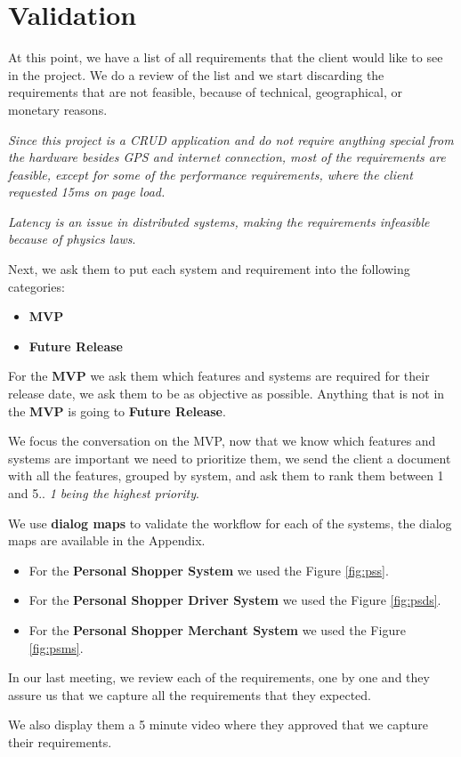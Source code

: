 \section{Validation }
At this point, we have a list of all requirements that the client would like to 
see in the project. We do a review of the list and we start discarding the
requirements that are not feasible, because of technical, geographical, or 
monetary reasons.\newline

\noindent \textit{Since this project is a CRUD application \cite{crud} and do 
not require anything special from the hardware besides GPS and internet 
connection, most of the requirements are feasible, except for 
some of the performance requirements, where the client 
requested 15ms on page load.}\newline

\noindent \textit{Latency is an issue in distributed systems, making the 
requirements infeasible because of physics laws}. \newline

\noindent Next, we ask them to put each system and requirement into the 
following categories:
\begin{itemize}
    \item \textbf{MVP} \cite{mvp}
    \item \textbf{Future Release}
\end{itemize}

\noindent For the \textbf{MVP} we ask them which features and systems are 
required for their release date, we ask them to be as objective as possible. 
Anything that is not in the \textbf{MVP} is going to 
\textbf{Future Release}. \newline

\noindent We focus the conversation on the MVP, now that we know which 
features and systems are important we need to prioritize them,  we send the 
client a document with all the features, grouped by system, and ask them to 
rank them between 1 and 5.. \textit{1 being the highest priority}. \newline

\noindent We use \textbf{dialog maps} to validate the workflow for each of 
the systems, the dialog maps are available in the Appendix. 
\begin{itemize}
    \item For the \textbf{Personal Shopper System} we used 
    the Figure \ref{fig:pss}. 
    \item For the \textbf{Personal Shopper Driver System} we used 
    the Figure \ref{fig:psds}. 
    \item For the \textbf{Personal Shopper Merchant System} we used 
    the Figure \ref{fig:psms}. 
\end{itemize}

\noindent In our last meeting, we review each of the requirements, one by one 
and they assure us that we capture all the requirements that they 
expected.  \linebreak

\noindent We also display them a 5 minute video where they approved that we 
capture their requirements.